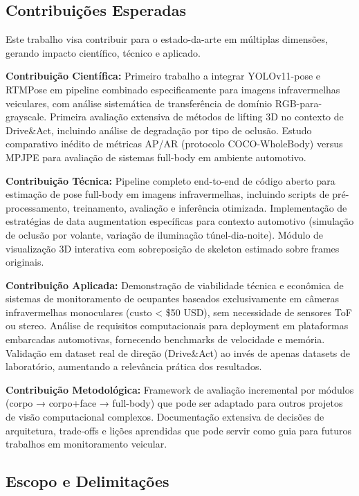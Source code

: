\documentclass[12pt, a4paper]{article}
\begin{document}
\subsection{Contribuições Esperadas}

Este trabalho visa contribuir para o estado-da-arte em múltiplas dimensões, gerando impacto científico, técnico e aplicado.

\textbf{Contribuição Científica:} Primeiro trabalho a integrar YOLOv11-pose e RTMPose em pipeline combinado especificamente para imagens infravermelhas veiculares, com análise sistemática de transferência de domínio RGB-para-grayscale. Primeira avaliação extensiva de métodos de lifting 3D no contexto de Drive\&Act, incluindo análise de degradação por tipo de oclusão. Estudo comparativo inédito de métricas AP/AR (protocolo COCO-WholeBody) versus MPJPE para avaliação de sistemas full-body em ambiente automotivo.

\textbf{Contribuição Técnica:} Pipeline completo end-to-end de código aberto para estimação de pose full-body em imagens infravermelhas, incluindo scripts de pré-processamento, treinamento, avaliação e inferência otimizada. Implementação de estratégias de data augmentation específicas para contexto automotivo (simulação de oclusão por volante, variação de iluminação túnel-dia-noite). Módulo de visualização 3D interativa com sobreposição de skeleton estimado sobre frames originais.

\textbf{Contribuição Aplicada:} Demonstração de viabilidade técnica e econômica de sistemas de monitoramento de ocupantes baseados exclusivamente em câmeras infravermelhas monoculares (custo < \$50 USD), sem necessidade de sensores ToF ou stereo. Análise de requisitos computacionais para deployment em plataformas embarcadas automotivas, fornecendo benchmarks de velocidade e memória. Validação em dataset real de direção (Drive\&Act) ao invés de apenas datasets de laboratório, aumentando a relevância prática dos resultados.

\textbf{Contribuição Metodológica:} Framework de avaliação incremental por módulos (corpo → corpo+face → full-body) que pode ser adaptado para outros projetos de visão computacional complexos. Documentação extensiva de decisões de arquitetura, trade-offs e lições aprendidas que pode servir como guia para futuros trabalhos em monitoramento veicular.

\subsection{Escopo e Delimitações}
\end{document}
